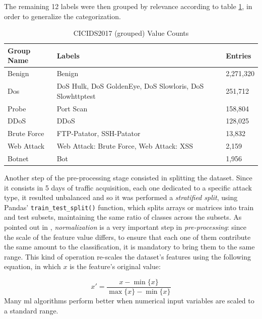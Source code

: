\noindent The remaining 12 labels were then grouped by relevance according to table \ref{tab:grouped-dataset-distribution}, in order to generalize the categorization.

\begin{table}[h!]
    \centering
    \begin{tabular}{l|l|l}
        \toprule 
        Group Name & Labels & Entries \\
        \midrule
        \rowcolor{black!10} Benign & Benign & 2,271,320 \\
        Dos & DoS Hulk, DoS GoldenEye, DoS Slowloris, DoS Slowhttptest &  251,712 \\
        \rowcolor{black!10}Probe & Port Scan & 158,804 \\
        DDoS & DDoS & 128,025 \\
        \rowcolor{black!10}Brute Force & FTP-Patator, SSH-Patator  & 13,832 \\
        Web Attack & Web Attack: Brute Force, Web Attack: XSS & 2,159 \\
        \rowcolor{black!10}Botnet & Bot & 1,956 \\
        \bottomrule
    \end{tabular}
    \caption{CICIDS2017 (grouped) Value Counts}
    \label{tab:grouped-dataset-distribution}
\end{table}

\noindent Another step of the pre-processing stage consisted in splitting the dataset. Since it consists in 5 days of traffic acquisition, each one dedicated to a specific attack type, it resulted unbalanced and so it was performed a \textit{stratified split}, using Pandas' \texttt{train\_test\_split()} function, which splits arrays or matrices into train and test subsets, maintaining the same ratio of classes across the subsets. As pointed out in \cite{Mozley2020}, \textit{normalization} is a very important step in \textit{pre-processing}: since the scale of the feature value differs, to ensure that each one of them contribute the same amount to the classification, it is mandatory to bring them to the same range. This kind of operation re-scales the dataset's features using the following equation, in which $x$ is the feature's original value:

\begin{equation}
    x\prime=\frac{x-\min\{x\}}{\max\{x\}-\min\{x\}}
\end{equation}
Many \gls{ml} algorithms perform better when numerical input variables are scaled to a standard range.

